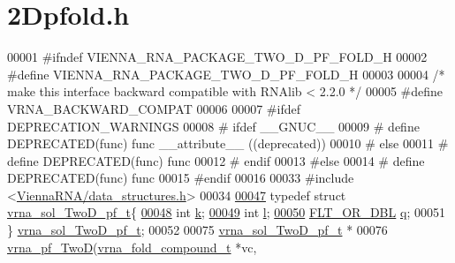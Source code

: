 \hypertarget{2Dpfold_8h_source}{}\section{2\+Dpfold.h}
\label{2Dpfold_8h_source}

\begin{DoxyCode}
00001 \textcolor{preprocessor}{#ifndef VIENNA\_RNA\_PACKAGE\_TWO\_D\_PF\_FOLD\_H}
00002 \textcolor{preprocessor}{#define VIENNA\_RNA\_PACKAGE\_TWO\_D\_PF\_FOLD\_H}
00003 
00004 \textcolor{comment}{/* make this interface backward compatible with RNAlib < 2.2.0 */}
00005 \textcolor{preprocessor}{#define VRNA\_BACKWARD\_COMPAT}
00006 
00007 \textcolor{preprocessor}{#ifdef DEPRECATION\_WARNINGS}
00008 \textcolor{preprocessor}{# ifdef \_\_GNUC\_\_}
00009 \textcolor{preprocessor}{#  define DEPRECATED(func) func \_\_attribute\_\_ ((deprecated))}
00010 \textcolor{preprocessor}{# else}
00011 \textcolor{preprocessor}{#  define DEPRECATED(func) func}
00012 \textcolor{preprocessor}{# endif}
00013 \textcolor{preprocessor}{#else}
00014 \textcolor{preprocessor}{# define DEPRECATED(func) func}
00015 \textcolor{preprocessor}{#endif}
00016 
00033 \textcolor{preprocessor}{#include <\hyperlink{data__structures_8h}{ViennaRNA/data\_structures.h}>}
00034 
\hypertarget{2Dpfold_8h_source.tex_l00047}{}\hyperlink{group__kl__neighborhood__pf}{00047} \textcolor{keyword}{typedef} \textcolor{keyword}{struct }\hyperlink{group__kl__neighborhood__pf_structvrna__sol__TwoD__pf__t}{vrna\_sol\_TwoD\_pf\_t}\{
\hypertarget{2Dpfold_8h_source.tex_l00048}{}\hyperlink{group__kl__neighborhood__pf_ad1f23b46dc4ebd373abdeb0382d87b83}{00048}   \textcolor{keywordtype}{int} \hyperlink{group__kl__neighborhood__pf_ad1f23b46dc4ebd373abdeb0382d87b83}{k};          
\hypertarget{2Dpfold_8h_source.tex_l00049}{}\hyperlink{group__kl__neighborhood__pf_a01133c264eff2c988d144e07803d1b8b}{00049}   \textcolor{keywordtype}{int} \hyperlink{group__kl__neighborhood__pf_a01133c264eff2c988d144e07803d1b8b}{l};          
\hypertarget{2Dpfold_8h_source.tex_l00050}{}\hyperlink{group__kl__neighborhood__pf_a17ebbf425b8769ded74b5c7b85e58ee1}{00050}   \hyperlink{group__data__structures_ga31125aeace516926bf7f251f759b6126}{FLT\_OR\_DBL}  \hyperlink{group__kl__neighborhood__pf_a17ebbf425b8769ded74b5c7b85e58ee1}{q};  
00051 \} \hyperlink{group__kl__neighborhood__pf_ga5e449fbd695406aabd2bcabddc374621}{vrna\_sol\_TwoD\_pf\_t};
00052 
00075 \hyperlink{group__kl__neighborhood__pf_structvrna__sol__TwoD__pf__t}{vrna\_sol\_TwoD\_pf\_t}  *
00076 \hyperlink{group__kl__neighborhood__pf_ga0bc3427689bd09da09b8b3094a27f836}{vrna\_pf\_TwoD}(\hyperlink{group__fold__compound_structvrna__fc__s}{vrna\_fold\_compound\_t} *vc,

\end{DoxyCode}
